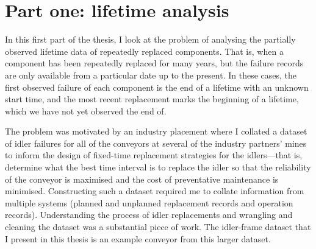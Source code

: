\documentclass[apa,colorlinks,emptypage]{curtinThesis}
\begin{document}
\createtitlepage %

\plagiarismstatement %

\showthesisquote %



















\part{Part one: lifetime analysis}\label{part:one}

In this first part of the thesis, I look at the problem of analysing the partially observed lifetime data of repeatedly replaced components. That is, when a component has been repeatedly replaced for many years, but the failure records are only available from a particular date up to the present. In these cases, the first observed failure of each component is the end of a lifetime with an unknown start time, and the most recent replacement marks the beginning of a lifetime, which we have not yet observed the end of.

The problem was motivated by an industry placement where I collated a dataset of idler failures for all of the conveyors at several of the industry partners' mines to inform the design of fixed-time replacement strategies for the idlers---that is, determine what the best time interval is to replace the idler so that the reliability of the conveyor is maximised and the cost of preventative maintenance is minimised. Constructing such a dataset required me to collate information from multiple systems (planned and unplanned replacement records and operation records). Understanding the process of idler replacements and wrangling and cleaning the dataset was a substantial piece of work. The idler-frame dataset that I present in this thesis is an example conveyor from this larger dataset.
\end{document}
